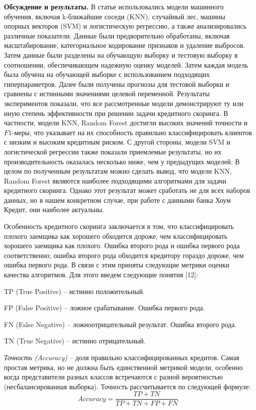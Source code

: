 {\bfseries Обсуждение и результаты.} В статье использовались модели
машинного обучения, включая k-ближайшие соседи (KNN), случайный лес,
машины опорных векторов (SVM) и логистическую регрессию, а также
анализировались различные показатели. Данные были предворительно
обработаны, включая масштабирование, категориальное кодирование
признаков и удаление выбросов. Затем данные были разделены на обучающую
выборку и тестовую выборку в соотношении, обеспечивающем надежную оценку
моделей. Затем каждая модель была обучена на обучающей выборке с
использованием подходящих гиперпараметров. Далее были получены прогнозы
для тестовой выборки и сравнены с истинными значениями целевой
переменной. Результаты экспериментов показали, что все рассмотренные
модели демонстрируют ту или иную степень эффективности при решении
задачи кредитного скоринга. В частности, модели KNN, Random Forest
достигли высоких значений точности и $F1$-меры, что указывает на их
способность правильно классифицировать клиентов с низким и высоким
кредитным риском. С другой стороны, модели SVM и логистической регрессии
также показали приемлемые результаты, но их производительность оказалась
несколько ниже, чем у предыдущих моделей. В целом по полученным
результатам можно сделать вывод, что модели KNN, Random Forest являются
наиболее подходящими алгоритмами для задачи кредитного скоринга. Однако
этот результат может сработать не для всех наборов данных, но в нашем
конкретном случае, при работе с данными банка Хоум Кредит, они наиболее
актуальны.

Особенность кредитного скоринга заключается в том, что классифицировать
плохого заемщика как хорошего обходится дороже, чем классифицировать
хорошего заемщика как плохого. Ошибка второго рода и ошибка первого рода
соответственно; ошибка второго рода обходится кредитору гораздо дороже,
чем ошибка первого рода. В связи с этим приняты следующие метрики оценки
качества алгоритмов. Для этого введем следующие понятия {[}12{]}:

TP (True Positive) -- истинно положительный.

FP (False Positive) -- ложное срабатывание. Ошибка первого рода.

FN (False Negative) -- ложноотрицательный результат. Ошибка второго
рода.

TN (True Negative) -- истинно отрицательный.

\emph{Точность (Accuracy)} -- доля правильно классифицированных
кредитов. Самая простая метрика, но не должна быть единственной метрикой
модели, особенно когда представители разных классов встречаются с разной
вероятностью (несбалансированная выборка). Точность рассчитывается по
следующей формуле:
\begin{equation}
	Accuracy = \frac{TP + TN}{TP + TN + FP + FN}
\end{equation}

